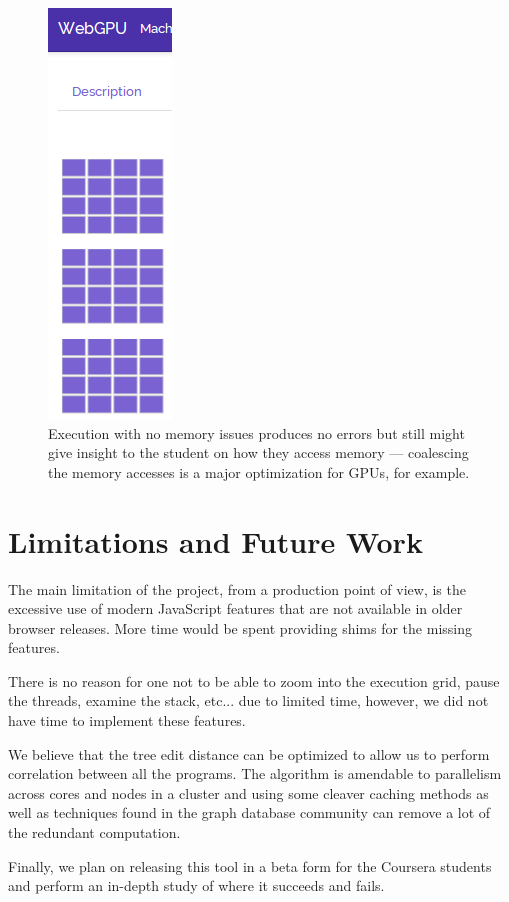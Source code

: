 \documentclass[nocopyrightspace]{sigchi}
\begin{document}
\begin{figure}[!h]
\centering
\includegraphics[height=0.9\columnwidth]{2}
\caption{Execution with no memory issues produces no errors but still might
give insight to the student on how they access memory --- coalescing the 
memory accesses is a major optimization for GPUs, for example.}
\label{fig:pipeline}
\end{figure}


\section{Limitations and Future Work}

The main limitation of the project, from a production point of view, 
is the excessive use of modern JavaScript features that are not available
in older browser releases. More time would be spent providing shims for
the missing features.

There is no reason for one not to be able to zoom into the execution grid,
pause the threads, examine the stack, etc... due to limited time, however,
we did not have time to implement these features.

We believe that the tree edit distance can be optimized to allow
us to perform correlation between all the programs. The algorithm is 
amendable to parallelism across cores and nodes in a cluster and using some
cleaver caching methods as well as techniques found in the graph 
database community can remove a lot of the redundant computation.

Finally, we plan on releasing this tool in a beta form for the Coursera 
students and perform an in-depth study of where it succeeds and fails.


\end{document}
